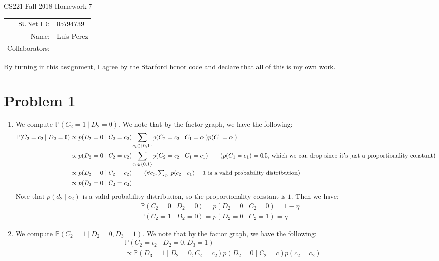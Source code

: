 \documentclass[12pt]{article}
\begin{document}
\begin{center}
{\Large CS221 Fall 2018 Homework 7}

\begin{tabular}{rl}
SUNet ID: & 05794739 \\
Name: & Luis Perez \\
Collaborators: &
\end{tabular}
\end{center}

By turning in this assignment, I agree by the Stanford honor code and declare
that all of this is my own work.

\section*{Problem 1}

\begin{enumerate}[label=(\alph*)]
  \item We compute $\mathbb{P}(C_2 = 1 \mid D_2 = 0)$. We note that by the factor graph, we have the following:
    \begin{align*}
      \mathbb{P}(C_2 = c_2 \mid D_2 = 0) &\propto p(D_2 = 0 \mid C_2 = c_2)\sum_{c_1 \in \{0,1 \}} p(C_2 = c_2 \mid C_1 = c_1)p(C_1 = c_1) \\
      &\propto p(D_2 = 0 \mid C_2 = c_2)\sum_{c_1 \in \{0,1 \}} p(C_2 = c_2 \mid C_1 = c_1) \tag{$p(C_1 = c_1) = 0.5$, which we can drop since it's just a proportionality constant} \\
      &\propto p(D_2 = 0 \mid C_2 = c_2) \tag{$\forall c_2, \sum_{c_1} p(c_2 \mid c_1)=1$ is a valid probability distribution} \\
      &\propto p(D_2 = 0 \mid C_2 = c_2)
    \end{align*}
    Note that $p(d_2 \mid c_2)$ is a valid probability distribution, so the proportionality constant is $1$. Then we have:
    \begin{align*}
      \mathbb{P}(C_2 = 0 \mid D_2 = 0) = p(D_2 = 0 \mid C_2 = 0) = 1- \eta \\
      \mathbb{P}(C_2 = 1 \mid D_2 = 0) = p(D_2 = 0 \mid C_2 = 1) =  \eta
    \end{align*}
  \item We compute $\mathbb{P}(C_2 = 1 \mid D_2 = 0, D_3 = 1)$. We note that by the factor graph, we have the following:
   \begin{align*}
    &\mathbb{P}(C_2 = c_2 \mid D_2 = 0, D_3 = 1)\\ &\propto \mathbb{P}(D_3 = 1 \mid D_2 = 0, C_2 = c_2)p(D_2 = 0 \mid C_2 = c)p(c_2 = c_2) \tag{Bayes' Rule} \\

\end{align*}
\end{enumerate}
\end{document}
